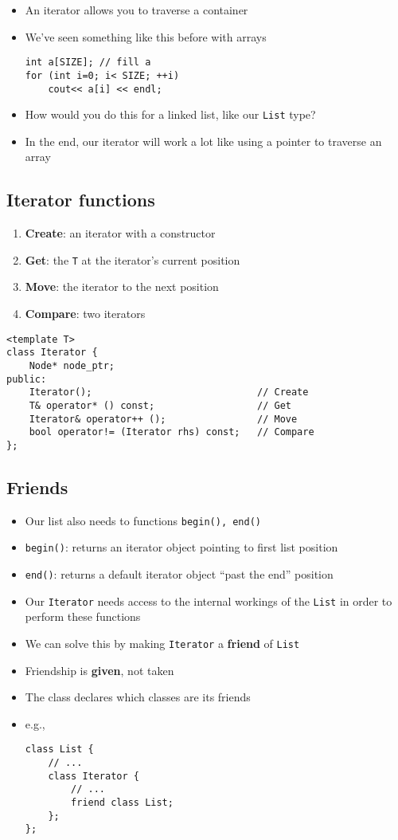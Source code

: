 \begin{itemize}
	\item An iterator allows you to traverse a container
	\item We’ve seen something like this before with arrays
\begin{lstlisting}[style=C++]
int a[SIZE]; // fill a
for (int i=0; i< SIZE; ++i)
	cout<< a[i] << endl;
\end{lstlisting}
	\item How would you do this for a linked list, like our \lstinline[style=C++]{List} type?
	\item In the end, our iterator will work a lot like using a pointer to traverse an array
\end{itemize}

\subsection{Iterator functions}
\begin{enumerate}
	\item \textbf{Create}: an iterator with a constructor
	\item \textbf{Get}: the \lstinline[style=C++]{T} at the iterator’s current position
	\item \textbf{Move}: the iterator to the next position
	\item \textbf{Compare}: two iterators
\end{enumerate}
\begin{lstlisting}[style=C++]
<template T>
class Iterator {
	Node* node_ptr;
public:
	Iterator(); 							// Create
	T& operator* () const; 					// Get
	Iterator& operator++ (); 				// Move
	bool operator!= (Iterator rhs) const;	// Compare
};
\end{lstlisting}

\subsection{Friends}
\begin{itemize}
	\item Our list also needs to functions \lstinline[style=C++]{begin(), end()} 
	\item \lstinline[style=C++]{begin()}: returns an iterator object pointing to first list position
	\item \lstinline[style=C++]{end()}: returns a default iterator object ``past the end'' position
	\item Our \lstinline[style=C++]{Iterator} needs access to the internal workings of the \lstinline[style=C++]{List} in order to perform these functions
	\item We can solve this by making \lstinline[style=C++]{Iterator} a \textbf{friend} of \lstinline[style=C++]{List}
	\item Friendship is \textbf{given}, not taken
	\item The class declares which classes are its friends
	\item e.g.,
\begin{lstlisting}[style=C++]
class List {
	// ...
	class Iterator {
		// ...
		friend class List;
	};
};
\end{lstlisting}
\end{itemize}

